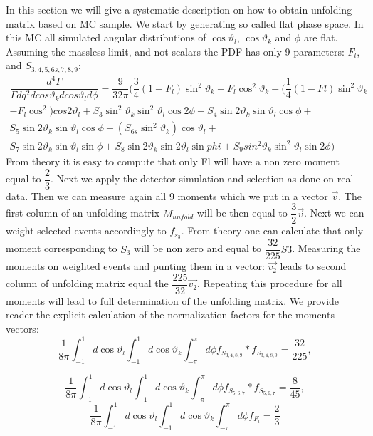 \documentclass[aps,prd,reprint,nofootinbib,preprintnumbers]{revtex4}
\renewcommand{\theta}{\vartheta}
\begin{document}
In this section we will give a systematic description on how to obtain unfolding matrix based on MC sample. We start by generating so called flat phase space. In this MC all simulated angular distributions of $\cos \theta_l$, $\cos \theta_k$ and $\phi$ are flat. Assuming the massless limit, and not scalars the PDF has only 9 parameters: $F_l$, and $S_{3,4,5,6s,7,8,9}$:
\begin{multline}
\dfrac{d^4\Gamma}{ \Gamma dq^2 dcos\theta_k dcos\theta_l d\phi}=\dfrac{9}{32\pi}( \dfrac{3}{4} (1-F_l) \sin^2 \theta_k + F_l\cos^2 \theta_k + ( \dfrac{1}{4}(1-Fl)\sin^2 \theta_k \\ -  F_l\cos^2) cos 2\theta_l  + S_3 \sin^2 \theta_k \sin^2 \theta_l \cos2\phi + S_4 \sin2 \theta_k \sin \theta_l \cos\phi +\\ S_5 \sin2 \theta_k \sin \theta_l \cos \phi +  (S_{6s} \sin^2 \theta_k) \cos \theta_l + \\ S_7 \sin 2\theta_k \sin \theta_l \sin \phi +  S_8 \sin 2 \theta_k \sin 2 \theta_l \sin phi + S_9 sin^2 \theta_k \sin^2 \theta_l \sin 2 \phi)
\label{PDF}
\end{multline}
From theory it is easy to compute that only Fl will have a non zero moment equal to $\dfrac{2}{3}$. Next we apply the detector simulation and selection as done on real data. Then we can measure again all 9 moments which we put in a vector $\overrightarrow{v}$. The first column of an unfolding matrix $M_{unfold}$ will be then equal to $\dfrac{3}{2} \overrightarrow{v}$. Next we can weight selected events accordingly to $f_{s_3}$. From theory one can calculate that only moment corresponding to $S_3$ will be non zero and equal to $\dfrac{32}{225} S3$. Measuring the moments on weighted events and punting them in a vector: $\overrightarrow{v_2}$ leads to second column of unfolding matrix equal the $\dfrac{225}{32} \overrightarrow{v_2}$. Repeating this procedure for all moments will lead to full determination of the unfolding matrix. We provide reader the explicit calculation of the normalization factors for the moments vectors:
\begin{equation}
\dfrac{1}{8\pi} \int_{-1}^{1} d\cos \theta_l \int_{-1}^{1} d\cos \theta_k  \int_{-\pi}^{\pi} d\phi f_{S_{3,4,8,9}}*f_{S_{3,4,8,9}}= \dfrac{32}{225} ,
\end{equation}

\begin{equation}
\dfrac{1}{8\pi} \int_{-1}^{1} d\cos \theta_l \int_{-1}^{1} d\cos \theta_k  \int_{-\pi}^{\pi} d\phi f_{S_{5,6,7}}*f_{S_{5,6,7}}= \dfrac{8}{45} ,
\end{equation}
\begin{equation}
\dfrac{1}{8\pi} \int_{-1}^{1} d\cos \theta_l \int_{-1}^{1} d\cos \theta_k  \int_{-\pi}^{\pi} d\phi f_{F_l}= \dfrac{2}{3} 
\end{equation}



\end{document}

